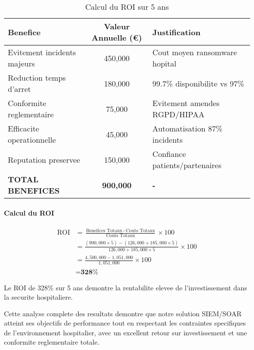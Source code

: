 \begin{table}[H]
    \centering
    \caption{Calcul du ROI sur 5 ans}
    \begin{tabular}{|l|c|l|}
        \hline
        \textbf{Benefice}           & \textbf{Valeur Annuelle (€)} & \textbf{Justification}         \\
        \hline
        Evitement incidents majeurs & 450,000                      & Cout moyen ransomware hopital  \\
        \hline
        Reduction temps d'arret     & 180,000                      & 99.7\% disponibilite vs 97\%   \\
        \hline
        Conformite reglementaire    & 75,000                       & Evitement amendes RGPD/HIPAA   \\
        \hline
        Efficacite operationnelle   & 45,000                       & Automatisation 87\% incidents  \\
        \hline
        Reputation preservee        & 150,000                      & Confiance patients/partenaires \\
        \hline
        \textbf{TOTAL BENEFICES}    & \textbf{900,000}             & \textbf{-}                     \\
        \hline
    \end{tabular}
\end{table}

\paragraph{Calcul du ROI}

\begin{align}
    \text{ROI} & = \frac{\text{Benefices Totaux} - \text{Couts Totaux}}{\text{Couts Totaux}} \times 100            \\
               & = \frac{(900,000 \times 5) - (126,000 + 185,000 \times 5)}{126,000 + 185,000 \times 5} \times 100 \\
               & = \frac{4,500,000 - 1,051,000}{1,051,000} \times 100                                              \\
               & = \textbf{328\%}
\end{align}

Le ROI de 328\% sur 5 ans demontre la rentabilite elevee de l'investissement dans la securite hospitaliere.

Cette analyse complete des resultats demontre que notre solution SIEM/SOAR atteint ses objectifs de performance tout en respectant les contraintes specifiques de l'environnement hospitalier, avec un excellent retour sur investissement et une conformite reglementaire totale.
